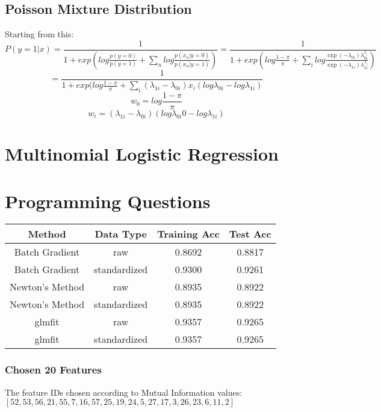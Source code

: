 \documentclass[letter,11pt]{article}
\begin{document}
	\subsection{Poisson Mixture Distribution}
	Starting from this:
		$$P(y = 1|x)  = \frac{1}{1 + exp(log \frac{p(y=0)}{p(y=1)}+ \sum_{n}log\frac{p(x_n|y=0)}{p(x_n|y=1)})} = \frac{1}{1 + exp(log \frac{1-\pi}{\pi} + \sum_{i} log \frac{\exp(-\lambda_{0i})\lambda_{0i}^{x_i}}{\exp(-\lambda_{1i})\lambda_{1i}^{x_i}})}$$
		$$ = \frac{1}{1 + exp(log \frac{1-\pi}{\pi} + \sum_{i}(\lambda_{1i} - \lambda_{0i})x_i(log \lambda_{0i} - log \lambda_{1i})}$$
		$$ w_0 = log \frac{1-\pi}{\pi}$$
		$$ w_i = (\lambda_{1i} - \lambda_{0i})(log \lambda_{0i}0 - log \lambda_{1i})$$
		
		
		
		\section{Multinomial Logistic Regression}
		
		\section{Programming Questions}
		\begin{center}
			\begin{tabular}{|c| c |c |c|} 
				\hline
				Method & Data Type & Training Acc & Test Acc \\ [0.5ex] 
				\hline
				Batch Gradient & raw & 0.8692 & 0.8817 \\ 
				\hline
				Batch Gradient & standardized & 0.9300 & 0.9261 \\
				\hline
				Newton's Method & raw & 0.8935 & 0.8922 \\
				\hline
				Newton's Method & standardized & 0.8935 & 0.8922 \\
				\hline
				glmfit & raw & 0.9357 & 0.9265 \\
				\hline
			    glmfit & standardized & 0.9357 & 0.9265 \\
				\hline
			\end{tabular}
		\end{center}
	\subsubsection{Chosen 20 Features}
	The feature IDs chosen according to Mutual Information values:\\
	$[52,53,56,21,55,7,16,57,25,19,24,5,27,17,3,26,23,6,11,2]$
	
\end{document}
